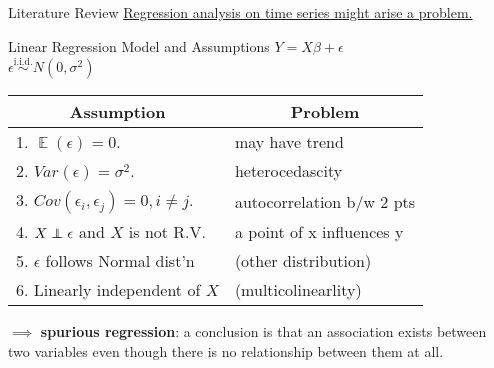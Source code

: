 \documentclass{beamer}\usepackage[]{graphicx}\usepackage[]{xcolor}
\newcommand\independent{\protect\mathpalette{\protect\independenT}{\perp}}
\def\independenT#1#2{\mathrel{\rlap{$#1#2$}\mkern2mu{#1#2}}}
\begin{document}
\begin{frame}{Literature Review}
    \underline{Regression analysis on time series might arise a problem.}
    \begin{block}{Linear Regression Model and Assumptions}
        \centering $Y = X\beta + \epsilon$\\
        \centering $\epsilon \overset{\text{i.i.d.}}{\sim} N(0, \sigma^2)$

        \small
        \begin{tabular}{ll}
            \hline
            \multicolumn{1}{c}{Assumption} & \multicolumn{1}{c}{Problem}    \\ \hline
            1. $\mathop{\mathbb{E}}(\epsilon) = 0.$ & may have trend  \\
            2. $Var(\epsilon) = \sigma^2.$& heterocedascity                \\
            3. $Cov(\epsilon_i,\epsilon_j) = 0, i\neq j.$& autocorrelation b/w 2 pts \\
            4. $X \independent \epsilon$ and $X$ is not R.V. & a point of x influences y      \\
            5. $\epsilon$ follows Normal dist'n & (other distribution)           \\
            6. Linearly independent of $X$ & (multicolinearlity)            \\ \hline
            \end{tabular}  
    \end{block}   
    $\implies$ \textbf{spurious regression}: a conclusion is that an association exists between two variables even though there is no relationship between them at all.
\end{frame}
\end{document}
